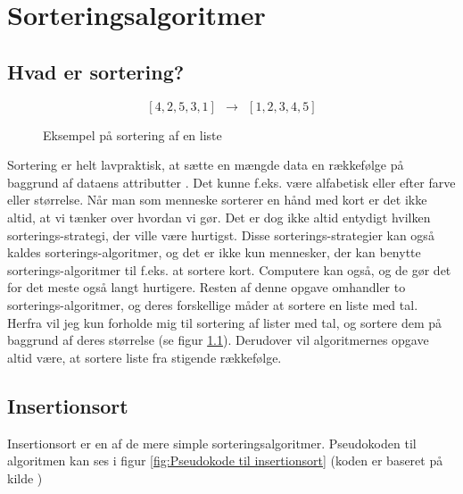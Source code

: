 \chapter{Sorteringsalgoritmer}
\label{ch:Sorteringsalgoritmer}

\section{Hvad er sortering?}
\label{sec:Hvad er sortering?}

\begin{figure}
	\begin{center}
		$$[4,2,5,3,1] \:\:\longrightarrow\:\: [1,2,3,4,5]$$
	\end{center}
	\caption{Eksempel på sortering af en liste}
	\label{fig:Eksempel på sortering af en liste}
\end{figure}


Sortering er helt lavpraktisk, at sætte en mængde data en rækkefølge på baggrund af dataens attributter \cite{what-is-sorting}. Det kunne f.eks. være alfabetisk eller efter farve eller størrelse. Når man som menneske sorterer en hånd med kort er det ikke altid, at vi tænker over hvordan vi gør. Det er dog ikke altid entydigt hvilken sorterings-strategi, der ville være hurtigst. Disse sorterings-strategier kan også kaldes sorterings-algoritmer, og det er ikke kun mennesker, der kan benytte sorterings-algoritmer til f.eks. at sortere kort. Computere kan også, og de gør det for det meste også langt hurtigere. Resten af denne opgave omhandler to sorterings-algoritmer, og deres forskellige måder at sortere en liste med tal.\\


Herfra vil jeg kun forholde mig til sortering af lister med tal, og sortere dem på baggrund af deres størrelse (se figur \ref{fig:Eksempel på sortering af en liste}). Derudover vil algoritmernes opgave altid være, at sortere liste fra stigende rækkefølge.


\section{Insertionsort}
\label{sec:Insertionsort}

Insertionsort er en af de mere simple sorteringsalgoritmer. Pseudokoden til algoritmen kan ses i figur \ref{fig:Pseudokode til insertionsort} (koden er baseret på kilde \cite[s. 104]{aogd})\\

